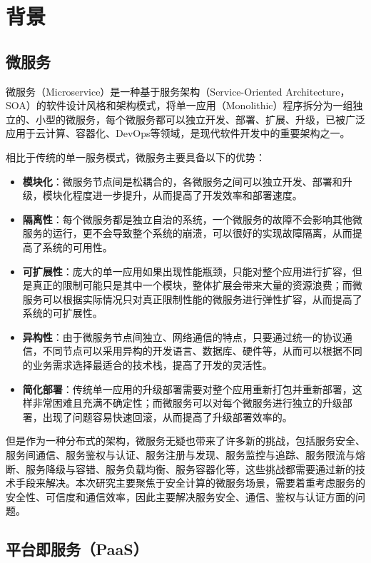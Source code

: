 \section{背景}\label{sec:background}

\subsection{微服务}
微服务（Microservice）是一种基于服务架构（Service-Oriented Architecture，SOA）的软件设计风格和架构模式，将单一应用（Monolithic）程序拆分为一组独立的、小型的微服务，每个微服务都可以独立开发、部署、扩展、升级，已被广泛应用于云计算、容器化、DevOps等领域，是现代软件开发中的重要架构之一。

相比于传统的单一服务模式，微服务主要具备以下的优势：

\begin{itemize}
    \item \textbf{模块化}：微服务节点间是松耦合的，各微服务之间可以独立开发、部署和升级，模块化程度进一步提升，从而提高了开发效率和部署速度。
    \item \textbf{隔离性}：每个微服务都是独立自治的系统，一个微服务的故障不会影响其他微服务的运行，更不会导致整个系统的崩溃，可以很好的实现故障隔离，从而提高了系统的可用性。
    \item \textbf{可扩展性}：庞大的单一应用如果出现性能瓶颈，只能对整个应用进行扩容，但是真正的限制可能只是其中一个模块，整体扩展会带来大量的资源浪费；而微服务可以根据实际情况只对真正限制性能的微服务进行弹性扩容，从而提高了系统的可扩展性。
    \item \textbf{异构性}：由于微服务节点间独立、网络通信的特点，只要通过统一的协议通信，不同节点可以采用异构的开发语言、数据库、硬件等，从而可以根据不同的业务需求选择最适合的技术栈，提高了开发的灵活性。
    \item \textbf{简化部署}：传统单一应用的升级部署需要对整个应用重新打包并重新部署，这样非常困难且充满不确定性；而微服务可以对每个微服务进行独立的升级部署，出现了问题容易快速回滚，从而提高了升级部署效率的。
\end{itemize}

但是作为一种分布式的架构，微服务无疑也带来了许多新的挑战，包括服务安全、服务间通信、服务鉴权与认证、服务注册与发现、服务监控与追踪、服务限流与熔断、服务降级与容错、服务负载均衡、服务容器化等，这些挑战都需要通过新的技术手段来解决。本次研究主要聚焦于安全计算的微服务场景，需要着重考虑服务的安全性、可信度和通信效率，因此主要解决服务安全、通信、鉴权与认证方面的问题。

\subsection{平台即服务（PaaS）}

